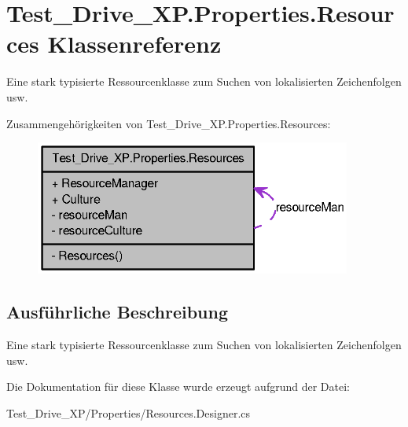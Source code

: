 \hypertarget{class_test___drive___x_p_1_1_properties_1_1_resources}{
\section{Test\_\-Drive\_\-XP.Properties.Resources Klassenreferenz}
\label{class_test___drive___x_p_1_1_properties_1_1_resources}
}


Eine stark typisierte Ressourcenklasse zum Suchen von lokalisierten Zeichenfolgen usw.  




Zusammengehörigkeiten von Test\_\-Drive\_\-XP.Properties.Resources:\nopagebreak
\begin{figure}[H]
\begin{center}
\leavevmode
\includegraphics[width=295pt]{class_test___drive___x_p_1_1_properties_1_1_resources__coll__graph}
\end{center}
\end{figure}


\subsection{Ausführliche Beschreibung}
Eine stark typisierte Ressourcenklasse zum Suchen von lokalisierten Zeichenfolgen usw. 

Die Dokumentation für diese Klasse wurde erzeugt aufgrund der Datei:\begin{DoxyCompactItemize}
\item 
Test\_\-Drive\_\-XP/Properties/Resources.Designer.cs\end{DoxyCompactItemize}
